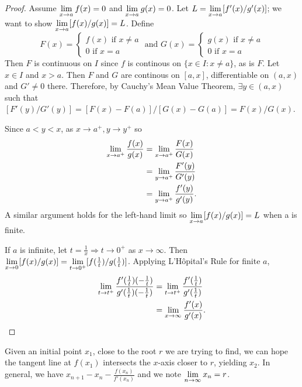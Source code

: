\documentclass[a4paper,11pt]{article}
\begin{document}
\begin{outline}
    \begin{proof}
      Assume \(\xlimit{x}{a}f(x) = 0\) and \(\xlimit{x}{a}g(x) = 0\). Let \(L = \xlimit{x}{a}[f'(x)/g'(x)]\);
      we want to show \(\xlimit{x}{a}[f(x)/g(x)] = L\). Define 
      \[ F(x) = 
        \begin{cases}
          f(x) \text{ if } x \neq a\\
          0 \text{ if } x = a
        \end{cases}\text{ and }
        G(x) = 
        \begin{cases}
          g(x) \text{ if } x \neq a\\
          0 \text{ if } x = a
        \end{cases}
      \]
      Then \(F\) is continuous on \(I\) since \(f\) is continous on \(\{x \in I : x \neq a\}\), as is \(F\).
      Let \(x \in I\) and \(x > a\). Then \(F\) and \(G\) are continous on \([a, x]\), differentiable on \((a, x)\)
      and \(G' \neq 0\) there. Therefore, by Cauchy's Mean Value Theorem, \(\exists y \in (a, x)\) such that
      \([F'(y)/G'(y)] = [F(x)-F(a)]/[G(x)-G(a)] = F(x)/G(x)\).
      
      Since \(a < y < x\), as \(x\rightarrow a^{+}, y\rightarrow y^{+}\) so 
      \begin{align*}
        \xlimit[+]{x}{a}\frac{f(x)}{g(x)} 
          &= \xlimit[+]{x}{a}\frac{F(x)}{G(x)}\\
          &= \xlimit[+]{y}{a}\frac{F'(y)}{G'(y)}\\
          &= \xlimit[+]{y}{a}\frac{f'(y)}{g'(y)}\text{.}
      \end{align*}
      A similar argument holds for the left-hand limit so \(\xlimit{x}{a}[f(x)/g(x)] = L\) when a is finite.
      
      If \(a\) is infinite, let \(t = \frac{1}{x} \Rightarrow t\rightarrow 0^{+}\) as \(x\rightarrow \infty\).
      Then \(\xlimit{x}{0}[f(x)/g(x)] = \xlimit[+]{t}{0}[f(\frac{1}{t})/g(\frac{1}{t})]\).
      Applying L'H\^{o}pital's Rule for finite \(a\),
      \begin{align*}
        \xlimit[+]{t}{t}\frac{f'(\frac{1}{t})(-\frac{1}{t})}{g'(\frac{1}{t})(-\frac{1}{t})}
          &= \xlimit[+]{t}{t}\frac{f'(\frac{1}{t})}{g'(\frac{1}{t})}\\
          &= \xlimit{x}{\infty}\frac{f'(x)}{g'(x)}\text{.}
      \end{align*}
    \end{proof}
    
    Given an initial point \(x_1\), close to the root \(r\) we are trying to find, we can hope the tangent line
    at \(f(x_1)\) intersects the \(x\)-axis closer to \(r\), yielding \(x_2\). In general, we have \(x_{n+1} -
    x_n - \frac{f(x_n)}{f'(x_n)}\) and we note \(\xlimit{n}{\infty}x_n = r\).
    

\end{outline}
\end{document}
